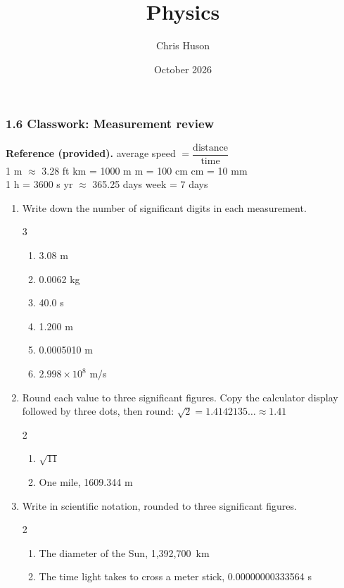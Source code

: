 \documentclass[12pt, twoside]{article}
\title{Physics}
\author{Chris Huson}
\date{October 2026}
\begin{document}
\subsubsection*{1.6 Classwork: Measurement review}

\textbf{Reference (provided).} \quad
average speed $= \dfrac{\text{distance}}{\text{time}}$ \\[0.1cm]
1 m $\approx$ 3.28 ft  km = 1000 m  m = 100 cm  cm = 10 mm \\
1 h = 3600 s  yr $\approx$ 365.25 days  week = 7 days

\vspace{0.3cm}

\begin{enumerate}[itemsep=0.6cm]

\item Write down the number of significant digits in each measurement.
  \begin{multicols}{3}
    \begin{enumerate}[itemsep=0.5cm]
      \item 3.08 m
      \item 0.0062 kg
      \item 40.0 s
      \item 1.200 m
      \item \num{0.0005010} m
      \item $2.998 \times 10^{8}$ m/s
    \end{enumerate}
  \end{multicols}

\item Round each value to three significant figures. Copy the calculator display
  followed by three dots, then round: $\sqrt{2} = 1.4142135\ldots \approx 1.41$
  \begin{multicols}{2}
    \raggedright
    \begin{enumerate}
      \item $\sqrt{11}$
      \item One mile, 1609.344 m
    \end{enumerate}
  \end{multicols} \vspace{1.0cm}

\item Write in scientific notation, rounded to three significant figures.
  \begin{multicols}{2}
    \raggedright
    \begin{enumerate}
      \item The diameter of the Sun, 1{,}392{,}700~km
      \item The time light takes to cross a meter stick, \num{0.00000000333564} s
    \end{enumerate}
  \end{multicols} \vspace{1.6cm}


\end{enumerate}
\end{document}
